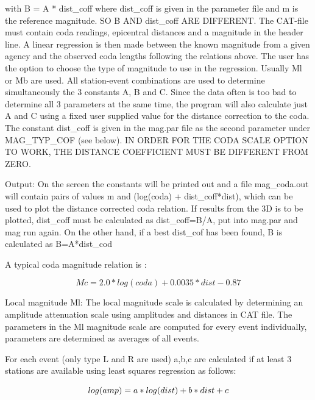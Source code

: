 with B = A * dist\_coff where dist\_coff is given in the parameter file and m is the reference magnitude. SO B AND dist\_coff ARE DIFFERENT. The CAT-file must contain coda readings, epicentral distances and a magnitude in the header line. A linear regression is then made between the known magnitude from a given agency and the observed coda lengths following the relations above. The user has the option to choose the type of magnitude to use in the regression. Usually Ml or Mb are used. All station-event combinations are used to determine simultaneously the 3 constants A, B and 
C. Since the data often is too bad to determine all 3 parameters at the same time, the program will also calculate just A and C using a fixed user supplied value for the distance correction to the coda. 
The constant dist\_coff is given in the mag.par file as the second parameter under MAG\_TYP\_COF (see below). IN ORDER FOR THE CODA SCALE OPTION TO WORK, THE DISTANCE COEFFICIENT MUST BE DIFFERENT FROM ZERO. 

Output: On the screen the constants will be printed out and a file mag\_coda.out will contain pairs of values m and (log(coda) + dist\_coff*dist), which can be used to plot the distance corrected coda relation. If results from the 3D is to be plotted, dist\_coff must be calculated as dist\_coff=B/A, put into mag.par and mag run again. On the other hand, if a best dist\_cof has been found, B is calculated as B=A*dist\_cod 

A typical coda magnitude relation is :

\begin{displaymath}
Mc = 2.0*log(coda) + 0.0035*dist - 0.87 
\end{displaymath}
\citep{lee1972} 

Local magnitude Ml: \newline
The local magnitude scale is calculated by determining an amplitude attenuation scale using amplitudes and distances in CAT file. The parameters in the Ml magnitude scale are computed for every event individually, parameters are determined as averages of all events. 

For each event (only type L and R are used) a,b,c are calculated if at least 3 stations are available 
using least squares regression as follows: 

\begin{displaymath}
log(amp) = a * log(dist) + b * dist + c \index{Amplitude attenuation}\index{Quality factor} 
\end{displaymath}

